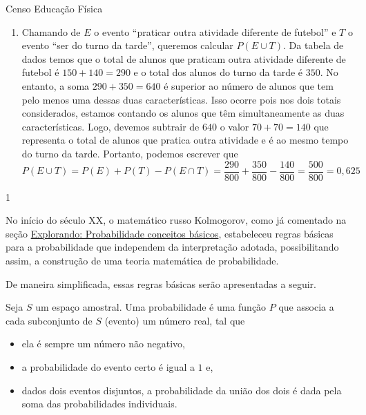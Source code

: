 \begin{answer}{Censo Educação Física}
{\begin{enumerate}
\item Chamando de $E$ o evento “praticar outra atividade diferente de futebol”{} e $T$ o evento “ser do turno da tarde”, queremos calcular $P(E\cup T)$. Da tabela de dados temos que o total de alunos que praticam outra atividade diferente de futebol é $150+140=290$ e o total dos alunos do turno da tarde é $350$. No entanto, a soma $290+350=640$ é superior ao número de alunos que tem pelo menos uma dessas duas características. Isso ocorre pois nos dois totais considerados, estamos contando os alunos que têm simultaneamente as duas características. Logo, devemos subtrair de $640$ o valor $70+70=140$ que representa o total de alunos que pratica outra atividade e é ao mesmo tempo do turno da tarde. Portanto, podemos escrever que
\begin{equation*}
P(E\cup T)=P(E)+P(T)-P(E\cap T)=\frac{290}{800}+\frac{350}{800}-\frac{140}{800}=\frac{500}{800}=0{,}625
\end{equation*}
\end{enumerate}
}{1}
\end{answer}

No início do século XX, o matemático russo Kolmogorov, como já comentado na seção \hyperref[conceitosbasicos]{Explorando: Probabilidade \textendash{} conceitos básicos}, estabeleceu regras básicas para a probabilidade que independem da interpretação adotada, possibilitando assim, a construção de uma teoria matemática de probabilidade.

De maneira simplificada, essas regras básicas serão apresentadas a seguir.

Seja \(S\) um espaço amostral. Uma probabilidade é uma função \(P\) que associa a cada subconjunto de \(S\) (evento)  um número real, tal que
\begin{itemize}
\item {} 
ela é sempre um número não negativo,

\item {} 
a probabilidade do evento certo é igual a $1$ e,

\item {} 
dados dois eventos disjuntos, a probabilidade da união dos dois é dada pela soma das probabilidades individuais.

\end{itemize}

